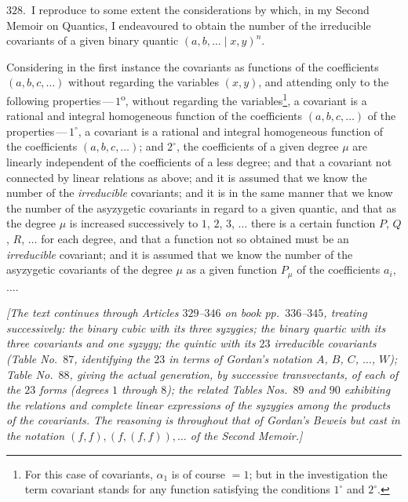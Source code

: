 \documentclass[11pt,a4paper]{article}
\providecommand{\midbar}{\mid}
\begin{document}
\noindent$328$.\ I reproduce to some extent the considerations by which,
in my Second Memoir on Quantics, I endeavoured to obtain the number of
the irreducible covariants of a given binary quantic
$(a, b, \dotsc\!\midbar\! x, y)^{n}$.

Considering in the first instance the covariants as functions of the
coefficients $(a, b, c, \dotsc)$ without regarding the variables $(x, y)$,
and attending only to the following properties\,---\,$1$\textsuperscript{o},
without regarding the variables\footnote{For this case of covariants,
$\alpha_{1}$ is of course $=1$; but in the investigation the term
covariant stands for any function satisfying the conditions
$1^{\circ}$ and $2^{\circ}$.}, a covariant is a rational and integral
homogeneous function of the coefficients $(a, b, c, \dotsc)$ of the
properties\,---\,$1^{\circ}$, a covariant is a rational and integral
homogeneous function of the coefficients $(a, b, c, \dotsc)$; and $2^{\circ}$,
the coefficients of a given degree $\mu$ are linearly independent of the
coefficients of a less degree; and that a covariant not connected by linear
relations as above; and it is assumed that we know the number of the
\textit{irreducible} covariants; and it is in the same manner that we know
the number of the asyzygetic covariants in regard to a given quantic, and
that as the degree $\mu$ is increased successively to $1$, $2$, $3$, $\dotsc$
there is a certain function $P$, $Q$, $R$, $\dotsc$ for each degree, and
that a function not so obtained must be an \textit{irreducible} covariant;
and it is assumed that we know the number of the asyzygetic covariants of
the degree $\mu$ as a given function $P_{\mu}$ of the coefficients $a_{i}$, $\dotsc$.

\medskip

\noindent\textit{[The text continues through Articles $329$--$346$ on book
pp.~$336$--$345$, treating successively: the binary cubic with its three
syzygies; the binary quartic with its three covariants and one syzygy; the
quintic with its $23$ irreducible covariants (Table No.~$87$, identifying
the $23$ in terms of Gordan's notation $A$, $B$, $C$, $\dotsc$, $W$);
Table No.~$88$, giving the actual generation, by successive transvectants,
of each of the $23$ forms (degrees $1$ through $8$); the related Tables
Nos.~$89$ and $90$ exhibiting the relations and complete linear
expressions of the syzygies among the products of the covariants. The
reasoning is throughout that of Gordan's \textit{Beweis} but cast in the
notation $(f,f), (f,(f,f)), \dotsc$ of the Second Memoir.]}
\end{document}
